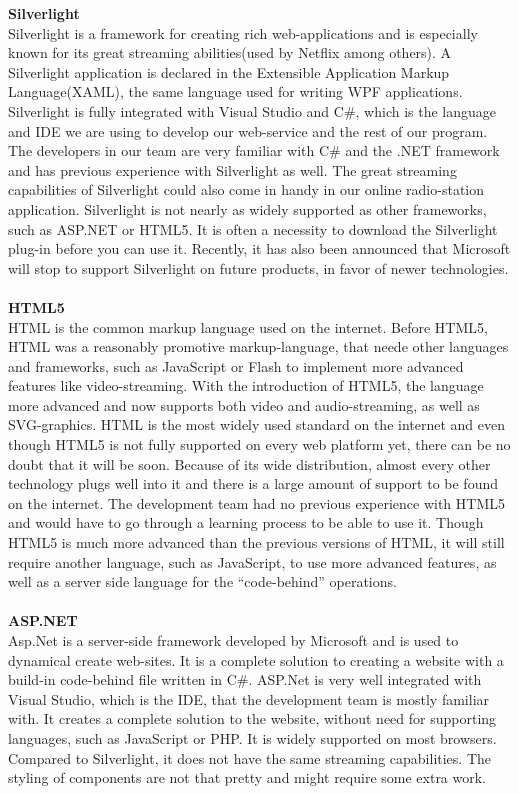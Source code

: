 \documentclass[a4paper,11pt,report]{article}
\begin{document}
\textbf{Silverlight} \\
Silverlight is a framework for creating rich web-applications and is especially known for its great streaming abilities(used by Netflix among others)\cite{netflix}. A Silverlight application is declared in the Extensible Application Markup Language(XAML), the same language used for writing WPF applications.  Silverlight is fully integrated with Visual Studio and C\#, which is the language and IDE we are using to develop our web-service and the rest of our program. The developers in our team are very familiar with C\# and the .NET framework and has previous experience with Silverlight as well. The great streaming capabilities of Silverlight could also come in handy in our online radio-station application. Silverlight is not nearly as widely supported as other frameworks, such as ASP.NET or HTML5. It is often a necessity to download the Silverlight plug-in before you can use it. Recently, it has also been announced that Microsoft will stop to support Silverlight on future products, in favor of newer technologies. \\ \\

\textbf{HTML5} \\
HTML is the common markup language used on the internet. Before HTML5, HTML was a reasonably promotive markup-language, that neede other languages and frameworks, such as JavaScript or Flash to implement more advanced features like video-streaming. With the introduction of HTML5, the language more advanced and now supports both video and audio-streaming, as well as SVG-graphics. HTML is the most widely used standard on the internet and even though HTML5 is not fully supported on every web platform yet, there can be no doubt that it will be soon. Because of its wide distribution, almost every other technology plugs well into it and there is a large amount of support to be found on the internet. The development team had no previous experience with HTML5 and would have to go through a learning process to be able to use it. Though HTML5 is much more advanced than the previous versions of HTML, it will still require another language, such as JavaScript, to use more advanced features, as well as a server side language for the “code-behind” operations. \\ \\

\textbf{ASP.NET} \\
Asp.Net is a server-side framework developed by Microsoft and is used to dynamical create web-sites. It is a complete solution to creating a website with a build-in code-behind file written in C\#. ASP.Net is very well integrated with Visual Studio, which is the IDE, that the development team is mostly familiar with. It creates a complete solution to the website, without need for supporting languages, such as JavaScript or PHP. It is widely supported on most browsers. Compared to Silverlight, it does not have the same streaming capabilities. The styling of components are not that pretty and might require some extra work. \\ \\
\end{document}
